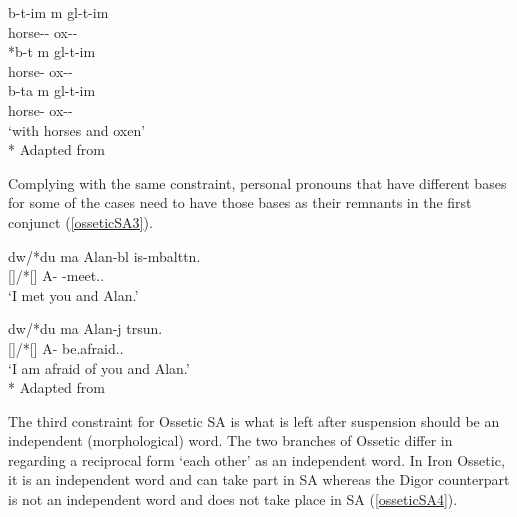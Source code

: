 \begin{exe}
    \ex \label{osseticSA2}
    \begin{xlist}
    \ex 
    \gll 
    {b\textturna\textchi-t-im\textturna} {\textturna m\textturna} {g\textturna l-t-im\textturna} \\ horse-{\Pl}-{\Com} {\And} ox-{\Pl}-{\Com} \\
    
    \ex 
    \gll 
    {*b\textturna\textchi-t} {\textturna m\textturna} {g\textturna l-t-im\textturna} \\ horse-{\Pl} {\And} ox-{\Pl}-{\Com} \\
    
    \ex 
    \gll 
    {b\textturna\textchi-ta} {\textturna m\textturna} {g\textturna l-t-im\textturna} \\ horse-{\Pl} {\And} ox-{\Pl}-{\Com} \\
    \glt `with horses and oxen'\\*
    \hfill Adapted from \citet{erschler2012suspended}
    \end{xlist}
\end{exe}

Complying with the same constraint, personal pronouns that have different bases for some of the cases need to have those bases as their remnants in the first conjunct (\ref{osseticSA3}).

\begin{exe}
    \ex \label{osseticSA3}
    \begin{xlist}
        \ex \gll 
        {d\textturna w/*du} {\textturna ma} {Alan-b\textturna l} {is-\textturna mbaltt\textturna n}. \\ {\Ssg}[{\Obl}]/*{\Ssg}[{\Nom}] {\And} A-{\Sup} {\Prv}-meet.{\Pst}.{\Fsg} \\
        \glt `I met you and Alan.'
        
        \ex \gll 
        {d\textturna w/*du} {\textturna ma} {Alan-\textturna j} {t\textturna rsun}. \\ {\Ssg}[{\Obl}]/*{\Ssg}[{\Nom}] {\And} A-{\Abl} be.afraid.{\Prs}.{\Fsg} \\
        \glt `I am afraid of you and Alan.'\\*
        \hfill Adapted from \citet{erschler2012suspended}
    \end{xlist}
\end{exe}

The third constraint for Ossetic SA is what is left after suspension should be an independent (morphological) word. The two branches of Ossetic differ in regarding a reciprocal form `each other' as an independent word. In Iron Ossetic, it is an independent word and can take part in SA whereas the Digor counterpart is not an independent word and does not take place in SA (\ref{osseticSA4}).

